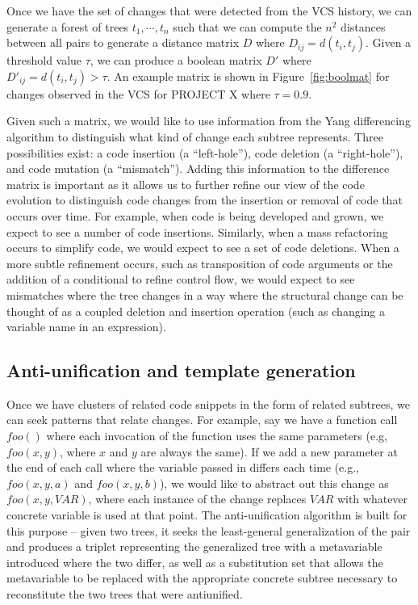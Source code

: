 \documentclass{acm_proc_article-sp}
\begin{document}
Once we have the set of changes that were detected from the VCS history,
we can generate a forest of trees $t_1, \cdots, t_n$ such that we can
compute the $n^2$ distances between all pairs to generate a distance matrix
$D$ where $D_{ij} = d(t_i, t_j)$.  Given a threshold value $\tau$, we can
produce a boolean matrix $D'$ where $D'_{ij} = d(t_i, t_j) > \tau$.  An
example matrix is shown in Figure~\ref{fig:boolmat} for changes observed
in the VCS for PROJECT X where $\tau = 0.9$.  

Given such a matrix, we would like to use information from the Yang
differencing algorithm to distinguish what kind of change each subtree
represents.  Three possibilities exist: a code insertion (a ``left-hole''),
code deletion (a ``right-hole''), and code mutation (a ``mismatch'').  Adding
this information to the difference matrix is important as it allows us to
further refine our view of the code evolution to distinguish code changes from
the insertion or removal of code that occurs over time. For example, when code
is being developed and grown, we expect to see a number of code insertions.
Similarly, when a mass refactoring occurs to simplify code, we would expect to
see a set of code deletions.  When a more subtle refinement occurs, such as
transposition of  code arguments or the addition of a conditional to refine
control flow, we would expect to see mismatches where the tree changes in a
way where the structural change can be thought of as a  coupled deletion and
insertion operation (such as changing a variable name in an expression).

\subsection{Anti-unification and template generation}

Once we have clusters of related code snippets in the form of related
subtrees, we can seek patterns that relate changes.  For example, say we have
a function call $foo()$ where each invocation of the function uses the same
parameters (e.g, $foo(x,y)$, where $x$ and $y$ are always the same). If we add
a new parameter at the end of each call where the variable passed in differs
each time (e.g., $foo(x,y,a)$ and $foo(x,y,b)$), we would like to abstract out
this change as $foo(x,y,VAR)$, where each instance of the change replaces
$VAR$ with whatever concrete variable is used at that point.  The anti-unification
algorithm is built for this purpose -- given two trees, it seeks the least-general
generalization of the pair and produces a triplet representing the generalized tree with
a metavariable introduced where the two differ, as well as a substitution set that allows
the metavariable to be replaced with the appropriate concrete subtree necessary to
reconstitute the two trees that were antiunified.
\end{document}
